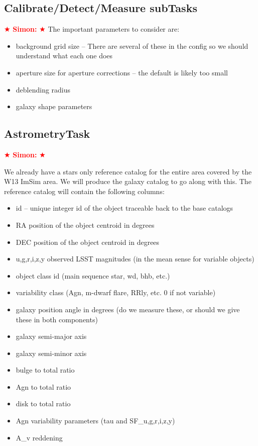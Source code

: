 \documentclass[12pt]{article}
\newcommand{\simon} { \textcolor{red} {
\ensuremath{\bigstar} {\bf Simon:}  
\ensuremath{\bigstar} } }
\begin{document}
\subsection{Calibrate/Detect/Measure subTasks} \simon
The important parameters to consider are:
\begin{itemize} 
\item background grid size -- There are several of these in the config
  so we should understand what each one does
\item aperture size for aperture corrections -- the default is likely
  too small
\item deblending radius
\item galaxy shape parameters
\end{itemize}

\subsection{AstrometryTask} \simon

We already have a stars only reference catalog for the entire area
covered by the W13 ImSim area.  We will produce the galaxy catalog to
go along with this.  The reference catalog will contain the following
columns:

\begin{itemize}
\item id -- unique integer id of the object traceable back to the base catalogs
\item RA position of the object centroid in degrees
\item DEC position of the object centroid in degrees
\item {u,g,r,i,z,y} observed LSST magnitudes (in the mean sense for variable objects)
\item object class id (main sequence star, wd, bhb, etc.)
\item variability class (Agn, m-dwarf flare, RRly, etc. 0 if not variable)
\item galaxy position angle in degrees (do we measure these, or should we give these in both components)
\item galaxy semi-major axis 
\item galaxy semi-minor axis
\item bulge to total ratio
\item Agn to total ratio
\item disk to total ratio
\item Agn variability parameters (tau and SF\_{u,g,r,i,z,y})
\item A\_v reddening 
\end{itemize}
\end{document}

